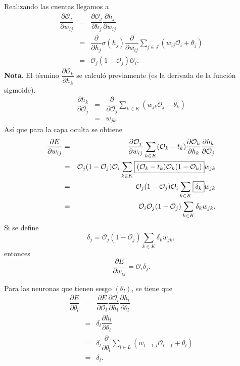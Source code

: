 \documentclass[12pt,letterpaper]{article}
\theoremstyle{definition}
\theoremstyle{definition}
\theoremstyle{definition}
\theoremstyle{definition}
\theoremstyle{definition}
\theoremstyle{definition}
\begin{document}
Realizando las cuentas llegamos a
\begin{eqnarray*}
	\boxed{\dfrac{\partial \mathcal{O}_{j}}{\partial  w_{i j}}}{} &=& \dfrac{\partial \mathcal{O}_{j}}{\partial  h_{j}}\dfrac{\partial h_{j}}{\partial  w_{i j}}  \\
	&=& \dfrac{\partial }{\partial  h_{j}} \sigma (h_{j}) \dfrac{\partial }{\partial  w_{i j}}  \sum_{j\in J} \left( w_{i j} \mathcal{O}_{i} + \theta_{j}\right)\\
	&=& \mathcal{O}_{j} (1-\mathcal{O}_{j}) \mathcal{O}_{i}.
\end{eqnarray*}
\textbf{Nota}. El término $ \dfrac{\partial \mathcal{O}_k}{\partial h_k} $ se calculó previamente (es la derivada de la función sigmoide).
\begin{eqnarray*}
	\boxed{\dfrac{\partial h_{k}}{\partial \mathcal{O}_{j}}}{} &=&  \dfrac{\partial }{\partial \mathcal{O}_{j}} \sum_{k\in K} \left(w_{j k} \mathcal{O}_{j} + \theta_{k}\right)\\														 								&=& w_{j k}.
\end{eqnarray*}
Así que para la capa oculta se obtiene
\begin{eqnarray*}
	\dfrac{\partial E}{\partial w_{i j}}&=&\textcolor{black}{\dfrac{\partial \mathcal{O}_{j}}{\partial w_{i j}}}\sum_{k\in K} (\mathcal{O}_{k}-t_{k}) \textcolor{black}{\dfrac{\partial \mathcal{O}_{k}}{\partial h_{k}}}\dfrac{\partial h_{k}}{\partial \mathcal{O}_{j}}\\
	&=&\textcolor{black}{\mathcal{O}_{j} (1-\mathcal{O}_{j}) \mathcal{O}_{i}} \sum_{k\in K} \boxed{(\mathcal{O}_{k}-t_{k}) \textcolor{black}{\mathcal{O}_{k} (1-\mathcal{O}_{k})}}w_{j k}\\
	&=&\textcolor{black}{\mathcal{O}_{j} (1-\mathcal{O}_{j}) \mathcal{O}_{i}} \sum_{k\in K} \boxed{\delta_{k}}w_{j k}\\
	&=&\textcolor{black}{\mathcal{O}_{i} \mathcal{O}_{j} (1-\mathcal{O}_{j})}  \sum_{k\in K} \delta_{k}w_{j k}.
\end{eqnarray*}
Si se define 
\[ \delta_{j} = \mathcal{O}_{j} (1-\mathcal{O}_{j})  \sum_{k\in K} \delta_{k} w_{j k}, \]
entonces 
\[ \dfrac{\partial E}{\partial w_{i j}} = \mathcal{O}_{i} \delta_{j}. \]

Para las neuronas que tienen sesgo $ (\theta_l) $, se tiene que 
\begin{eqnarray*}
	\dfrac{\partial E}{\partial \theta_l}&=&\boxed{\dfrac{\partial E}{\partial \mathcal{O}_l}\dfrac{\partial \mathcal{O}_l}{\partial h_l}}{}\dfrac{\partial h_l}{\partial \theta_l}\\
	&=& \boxed{\delta_l} \dfrac{\partial h_l}{\partial \theta_l}\\
	&=& \delta_l\dfrac{\partial}{\partial \theta_l}\sum_{l\in L}\left( w_{l-1,l} \mathcal{O}_{l-1} + \theta_l\right)\\
	&=& \delta_l.
\end{eqnarray*}
\end{document}
